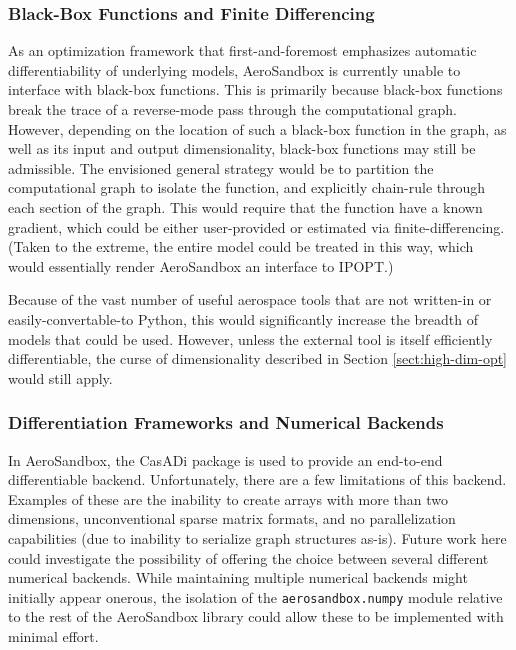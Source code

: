 \subsubsection{Black-Box Functions and Finite Differencing}
\label{sect:future-work-black-box}

As an optimization framework that first-and-foremost emphasizes automatic differentiability of underlying models, AeroSandbox is currently unable to interface with black-box functions. This is primarily because black-box functions break the trace of a reverse-mode pass through the computational graph. However, depending on the location of such a black-box function in the graph, as well as its input and output dimensionality, black-box functions may still be admissible. The envisioned general strategy would be to partition the computational graph to isolate the function, and explicitly chain-rule through each section of the graph. This would require that the function have a known gradient, which could be either user-provided or estimated via finite-differencing. (Taken to the extreme, the entire model could be treated in this way, which would essentially render AeroSandbox an interface to IPOPT.)

Because of the vast number of useful aerospace tools that are not written-in or easily-convertable-to Python, this would significantly increase the breadth of models that could be used. However, unless the external tool is itself efficiently differentiable, the curse of dimensionality described in Section \ref{sect:high-dim-opt} would still apply.


\subsubsection{Differentiation Frameworks and Numerical Backends}

In AeroSandbox, the CasADi package is used to provide an end-to-end differentiable backend. Unfortunately, there are a few limitations of this backend. Examples of these are the inability to create arrays with more than two dimensions, unconventional sparse matrix formats, and no parallelization capabilities (due to inability to serialize graph structures as-is). Future work here could investigate the possibility of offering the choice between several different numerical backends. While maintaining multiple numerical backends might initially appear onerous, the isolation of the \texttt{aerosandbox.numpy} module relative to the rest of the AeroSandbox library could allow these to be implemented with minimal effort.

